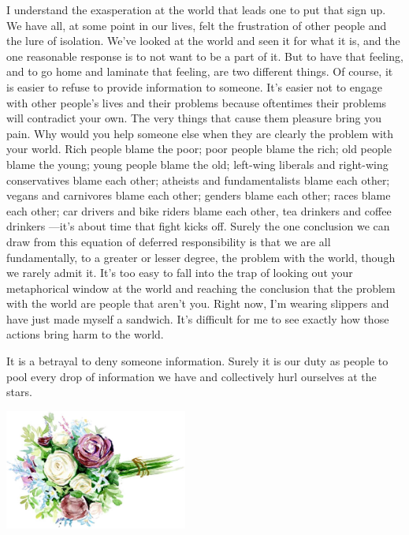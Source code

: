 

I understand the exasperation at the world that leads one to put that sign up. We have all, at some point in our lives, felt the frustration of other people and the lure of isolation. We've looked at the world and seen it for what it is, and the one reasonable response is to not want to be a part of it. But to have that feeling, and to go home and laminate that feeling, are two different things. Of course, it is easier to refuse to provide information to someone. It's easier not to engage with other people's lives and their problems because oftentimes their problems will contradict your own. The very things that cause them pleasure bring you pain. Why would you help someone else when they are clearly the problem with your world. Rich people blame the poor; poor people blame the rich; old people blame the young; young people blame the old; left-wing liberals and right-wing conservatives blame each other; atheists and fundamentalists blame each other; vegans and carnivores blame each other; genders blame each other; races blame each other; car drivers and bike riders blame each other, tea drinkers and coffee drinkers ---it's about time that fight kicks off. Surely the one conclusion we can draw from this equation of deferred responsibility is that we are all fundamentally, to a greater or lesser degree, the problem with the world, though we rarely admit it. It's too easy to fall into the trap of looking out your metaphorical window at the world and reaching the conclusion that the problem with the world are people that aren't you. Right now, I'm wearing slippers and have just made myself a sandwich. It's difficult for me to see exactly how those actions bring harm to the world. 

It is a betrayal to deny someone information. Surely it is our duty as people to pool every drop of information we have and collectively hurl ourselves at the stars.

\vspace{5mm}
\begin{center}
\includegraphics[width=0.45\textwidth]{graphics/flower.jpg}
\end{center}
